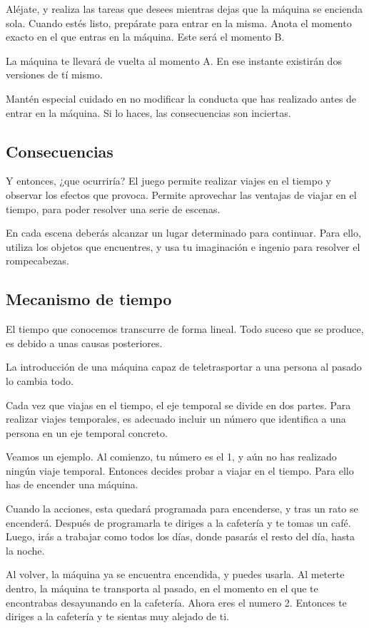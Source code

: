 \documentclass[11pt,a4paper]{article}
\begin{document}
Aléjate, y realiza las tareas que desees mientras dejas que la máquina se 
encienda sola. Cuando estés listo, prepárate para entrar en la misma. Anota el 
momento exacto en el que entras en la máquina. Este será el momento B.

La máquina te llevará de vuelta al momento A. En ese instante existirán dos 
versiones de tí mismo.

Mantén especial cuidado en no modificar la conducta que has realizado antes de 
entrar en la máquina. Si lo haces, las consecuencias son inciertas. 

\subsection{Consecuencias}

Y entonces, ¿que ocurriría? El juego permite realizar viajes en el tiempo y 
observar los efectos que provoca. Permite aprovechar las ventajas de viajar en 
el tiempo, para poder resolver una serie de escenas.

En cada escena deberás alcanzar un lugar determinado para continuar. Para ello, 
utiliza los objetos que encuentres, y usa tu imaginación e ingenio para resolver 
el rompecabezas.

\subsection{Mecanismo de tiempo}
El tiempo que conocemos transcurre de forma lineal. Todo suceso que se produce, 
es debido a unas causas posteriores.

La introducción de una máquina capaz de teletrasportar a una persona al pasado 
lo cambia todo.

Cada vez que viajas en el tiempo, el eje temporal se divide en dos partes. Para 
realizar viajes temporales, es adecuado incluir un número que identifica a una 
persona en un eje temporal concreto.

Veamos un ejemplo. Al comienzo, tu número es el 1, y aún no has realizado ningún 
viaje temporal. Entonces decides probar a viajar en el tiempo. Para ello has de 
encender una máquina.

Cuando la acciones, esta quedará programada para encenderse, y tras un rato se 
encenderá. Después de programarla te diriges a la cafetería y te tomas un café.  
Luego, irás a trabajar como todos los días, donde pasarás el resto del día, 
hasta la noche.

Al volver, la máquina ya se encuentra encendida, y puedes usarla. Al meterte 
dentro, la máquina te transporta al pasado, en el momento en el que te 
encontrabas desayunando en la cafetería. Ahora eres el numero 2. Entonces te 
diriges a la cafetería y te sientas muy alejado de ti.
\end{document}

